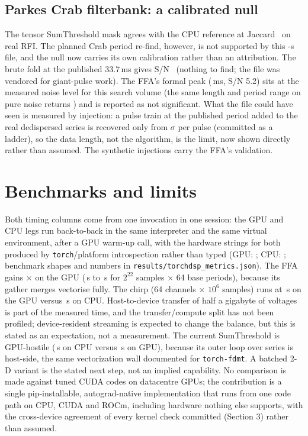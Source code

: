 \documentclass[twocolumn]{aastex631}
\newcommand{\code}[1]{\texttt{#1}}
\begin{document}
\subsection{Parkes Crab filterbank: a calibrated null}
The tensor SumThreshold mask agrees with the CPU reference at Jaccard \tdRealCrabJaccard\ on
real RFI. The planned Crab period re-find, however, is not supported by this
\tdRealCrabDur-s file, and the null now carries its own calibration rather than an
attribution. The brute fold at the published 33.7\,ms gives S/N \tdRealCrabFoldPub\ (nothing
to find; the file was vendored for giant-pulse work). The FFA's formal peak
(\tdRealCrabPeriodMs\,ms, S/N 5.2) sits at the measured noise level for this search volume
(the same length and period range on pure noise returns \tdRealCrabNoiseSnr) and is
reported as not significant. What the file could have seen is measured by injection: a pulse
train at the published period added to the real dedispersed series is recovered only from
\tdRealCrabInjMin$\sigma$ per pulse (committed as a ladder), so the data length, not the
algorithm, is the limit, now shown directly rather than assumed. The synthetic injections carry
the FFA's validation.

\section{Benchmarks and limits}
\label{sec:bench}
Both timing columns come from one invocation in one session: the GPU and CPU legs run
back-to-back in the same interpreter and the same virtual environment, after a GPU warm-up
call, with the hardware strings for both produced by \code{torch}/platform introspection
rather than typed (GPU: \tdBenchHwGpu; CPU: \tdBenchHwCpu; benchmark shapes and numbers in
\code{results/torchdsp\_metrics.json}). The FFA gains \tdRealSpeedupFfa$\times$ on the GPU
(\tdRealBenchFfaCpu\,s to \tdRealBenchFfaGpu\,s for $2^{22}$ samples $\times$ 64 base
periods), because its gather merges vectorise fully. The chirp (64 channels $\times$ $10^6$
samples) runs at \tdRealBenchChirpGpu\,s on the GPU versus \tdRealBenchChirpCpu\,s on CPU.
Host-to-device transfer of half a gigabyte of voltages is part of the measured time, and the
transfer/compute split has not been profiled; device-resident streaming is expected to
change the balance, but this is stated as an expectation, not a measurement. The current
SumThreshold is GPU-hostile (\tdRealBenchStCpu\,s on CPU versus \tdRealBenchStGpu\,s on
GPU), because its outer loop over series is host-side, the same vectorization wall
documented for \code{torch-fdmt}. A batched 2-D variant is the stated next step, not an
implied capability. No comparison is made against tuned CUDA codes on datacentre GPUs; the
contribution is a single pip-installable, autograd-native implementation that runs from one
code path on CPU, CUDA and ROCm, including hardware nothing else supports, with the
cross-device agreement of every kernel check committed (Section 3) rather than assumed.
\end{document}
